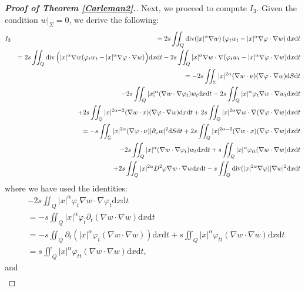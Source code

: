 \documentclass[11pt]{article}
\numberwithin{equation}{section}
\def\pt{\partial}
\def\vp{\varphi}
\def\bf{\textbf}
\def\pt{\partial}
\def\al{\alpha}
\def\df{\mathrm d}
\DeclareMathOperator{\Div}{div}
\begin{document}
\begin{proof}[{\rm \bf { Proof of  Theorem \ref{Carleman2}.}}]
			
			Next, we proceed to compute  $I_3$. Given the condition  $w|_{\Sigma}=0$,  we derive the following:
			\begin{eqnarray*}
				I_3
				&&=2s\iint_Q \Div(|x|^\al \nabla w) \left(\vp_tw_t-|x|^\al \nabla\vp\cdot \nabla w\right)\df x\df t\\
				&&=2s\iint_Q\Div\Big(|x|^\al \nabla w(\vp_tw_t-|x|^\al \nabla\vp\cdot \nabla w)\Big)\df x\df t-2s\iint_Q|x|^\al \nabla w\cdot \nabla (\vp_tw_t-|x|^\al \nabla\vp\cdot \nabla w)\df x\df t\\
				&&=-2s\iint_\Sigma |x|^{2\al}(\nabla w\cdot \nu)(\nabla \vp\cdot \nabla w)\df S\df t\\
				&&\hspace{4.5mm}-2s\iint_Q|x|^\al (\nabla w\cdot \nabla \vp_t)w_t\df x\df t-2s\iint_Q|x|^\al \vp_t\nabla w\cdot \nabla w_t\df x\df t\\
				&&\hspace{4.5mm}+2s\iint_Q|x|^{2\al-2}(\nabla w\cdot x)(\nabla \vp\cdot \nabla w)\df x\df t+2s\iint_Q|x|^{2\al}\nabla w\cdot \nabla(\nabla \vp\cdot \nabla w)\df x\df t\\
				&&=-s\iint_\Sigma  |x|^{2\al}(\nabla \vp\cdot\nu) |\pt_\nu w|^2 \df S\df t+2s\iint_Q|x|^{2\al-2}(\nabla w\cdot x)(\nabla \vp\cdot \nabla w)\df x\df t\\
				&&\hspace{4.5mm}-2s\iint_Q|x|^\al (\nabla w\cdot \nabla \vp_t)w_t\df x\df t+s\iint_Q|x|^\al \vp_{tt}(\nabla w\cdot \nabla w)\df x\df t\\
				&&\hspace{4.5mm}+2s\iint_Q|x|^{2\al}D^2\vp\nabla w\cdot \nabla w\df x\df t-s\iint_Q\Div(|x|^{2\al}\nabla\vp)|\nabla w|^2\df x\df t
			\end{eqnarray*}
			where we have used the identities:
			\begin{equation*}
				\begin{split}
					&-2s\iint_Q|x|^\al \vp_t\nabla w\cdot \nabla\vp_t\df x\df t\\
					&=-s\iint_Q|x|^\al\vp_t\pt_t\left(\nabla w\cdot \nabla w\right)\df x\df t\\
					&=-s\iint_Q\pt_t\left(|x|^\al \vp_t (\nabla w\cdot \nabla w)\right)\df x\df t+s\iint_Q|x|^\al \vp_{tt}(\nabla w\cdot \nabla w)\df x\df t\\
					&=s\iint_Q|x|^\al \vp_{tt}(\nabla w\cdot \nabla w)\df x\df t,
				\end{split}
			\end{equation*}
			and
			\begin{eqnarray*}

\end{eqnarray*}
\end{proof}
\end{document}
